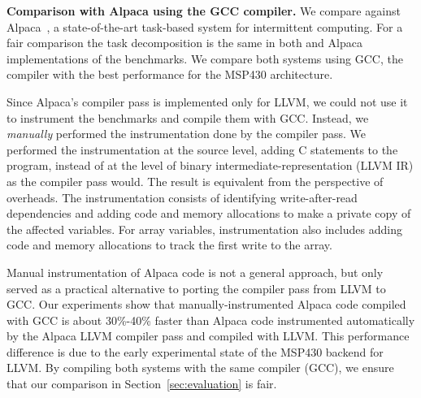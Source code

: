 
\textbf{Comparison with Alpaca using the GCC compiler.} We compare
\sys against Alpaca~\cite{alpaca}, a state-of-the-art task-based system for
intermittent computing. For a fair comparison the task decomposition is the
same in both \sys and Alpaca implementations of the benchmarks. We compare
both systems using GCC, the compiler with the best performance for the
MSP430 architecture.

Since Alpaca's compiler pass is implemented only for LLVM, we could not use it
to instrument the benchmarks and compile them with GCC. Instead, we
\emph{manually} performed the instrumentation done by the compiler pass.
We performed the instrumentation at the source level, adding C
statements to the program, instead of at the level of binary
intermediate-representation (LLVM IR) as the compiler pass would. The result is
equivalent from the perspective of overheads. The
instrumentation consists of identifying write-after-read dependencies and
adding code and memory allocations to make a private copy of the
affected variables. For array variables, instrumentation also includes adding
code and memory allocations to track the first write to the array.

Manual instrumentation of Alpaca code is not a general approach, but only
served as a practical alternative to porting the compiler pass from LLVM to
GCC.
%
Our experiments show that manually-instrumented Alpaca code compiled with GCC
is about 30\%-40\% faster than Alpaca code instrumented automatically by the
Alpaca LLVM compiler pass and compiled with LLVM. This performance difference is due to the early experimental state of the MSP430 backend for LLVM.
%
By compiling both systems with the same compiler (GCC), we ensure that our
comparison in Section~\ref{sec:evaluation} is fair.

